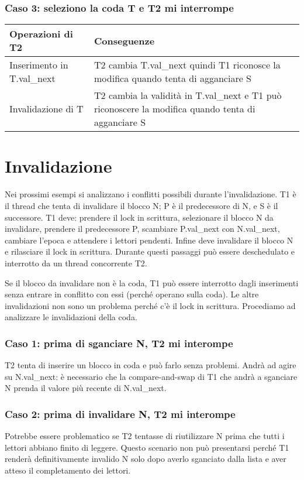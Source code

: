 \documentclass[a4paper,12pt,oneside]{book}
\begin{document}
\subsubsection{Caso 3: seleziono la coda T e T2 mi interrompe}

\begin{table}[H]
\centering
\begin{tabular}{| l p{8cm} |}
	\hline
	Operazioni di T2 & Conseguenze \\ [0.5ex]
	\hline
	Inserimento in T.val\_next & T2 cambia T.val\_next quindi T1 riconosce la modifica quando tenta di agganciare S \\ [1ex]
	Invalidazione di T & T2 cambia la validità in T.val\_next e T1 può riconoscere la modifica quando tenta di agganciare S\\ [1ex]
	\hline
\end{tabular}
\label{table:1}
\end{table}

	\section{Invalidazione}
	Nei prossimi esempi si analizzano i conflitti possibili durante l'invalidazione. T1 è il thread che tenta di invalidare il blocco N; P è il predecessore di N, e S è il successore. T1 deve: prendere il lock in scrittura, selezionare il blocco N da invalidare, prendere il predecessore P, scambiare P.val\_next con N.val\_next, cambiare l'epoca e attendere i lettori pendenti. Infine deve invalidare il blocco N e rilasciare il lock in scrittura. Durante questi passaggi può essere deschedulato e interrotto da un thread concorrente T2.

	Se il blocco da invalidare non è la coda, T1 può essere interrotto dagli inserimenti senza entrare in conflitto con essi (perché operano sulla coda). Le altre invalidazioni non sono un problema perché c'è il lock in scrittura. Procediamo ad analizzare le invalidazioni della coda.

	\subsubsection{Caso 1: prima di sganciare N, T2 mi interompe}
	T2 tenta di inserire un blocco in coda e può farlo senza problemi. Andrà ad agire su N.val\_next: è necessario che la compare-and-swap di T1 che andrà a sganciare N prenda il valore più recente di N.val\_next.

	\subsubsection{Caso 2: prima di invalidare N, T2 mi interompe}
	Potrebbe essere problematico se T2 tentasse di riutilizzare N prima che tutti i lettori abbiano finito di leggere. Questo scenario non può presentarsi perché T1 renderà definitivamente invalido N solo dopo averlo sganciato dalla lista e aver atteso il completamento dei lettori.
\end{document}
